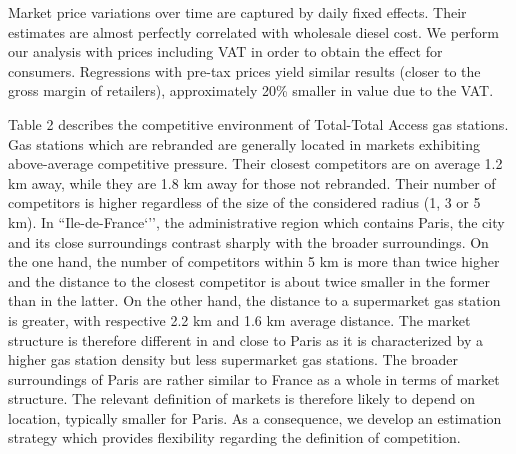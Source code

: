 \documentclass[english]{article}
\begin{document}
Market price variations over time are captured by daily fixed effects. Their estimates are almost perfectly correlated with wholesale diesel cost. We perform our analysis with prices including VAT in order to obtain the effect for consumers. Regressions with pre-tax prices yield similar results (closer to the gross margin of retailers), approximately 20\% smaller in value due to the VAT.

Table 2 describes the competitive environment of Total-Total Access gas stations. Gas stations which are rebranded are generally located in markets exhibiting above-average competitive pressure. Their closest competitors are on average 1.2 km away, while they are 1.8 km away for those not rebranded. Their number of competitors is higher regardless of the size of the considered radius (1, 3 or 5 km). In ``Ile-de-France`'', the administrative region which contains Paris, the city and its close surroundings contrast sharply with the broader surroundings. On the one hand, the number of competitors within 5 km is more than twice higher and the distance to the closest competitor is about twice smaller in the former than in the latter. On the other hand, the distance to a supermarket gas station is greater, with respective 2.2 km and 1.6 km average distance. The market structure is therefore different in and close to Paris as it is characterized by a higher gas station density but less supermarket gas stations. The broader surroundings of Paris are rather similar to France as a whole in terms of market structure. The relevant definition of markets is therefore likely to depend on location, typically smaller for Paris. As a consequence, we develop an estimation strategy which provides flexibility regarding the definition of competition.
\end{document}
